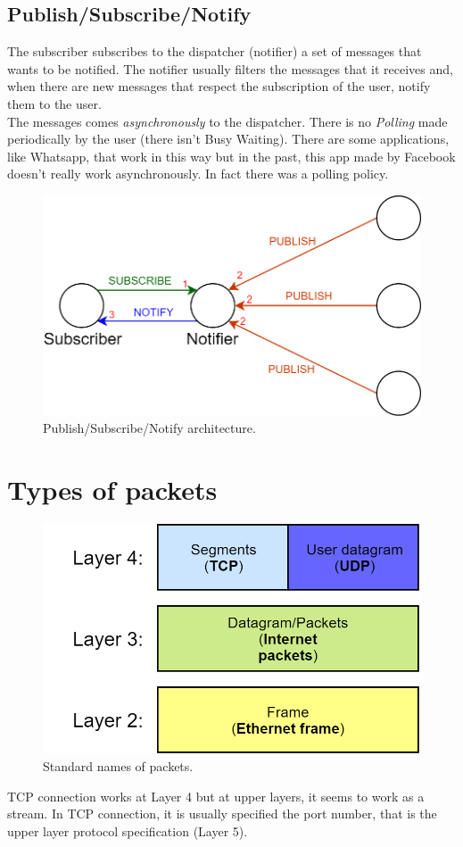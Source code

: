 \subsection{Publish/Subscribe/Notify}
The subscriber subscribes to the dispatcher (notifier) a set of messages that wants to be notified. The notifier usually filters the messages that it receives and, when there are new messages that respect the subscription of the user, notify them to the user.\\ The messages comes \textit{asynchronously} to the dispatcher. There is no \textit{Polling} made periodically by the user (there isn't Busy Waiting). There are some applications, like Whatsapp, that work in this way but in the past, this app made by Facebook doesn't really work asynchronously. In fact there was a polling policy.
\begin{figure}[H]
\centering
\includegraphics[scale=0.35]{Images/OSI/publish_subscribe}
\caption{\footnotesize{Publish/Subscribe/Notify architecture.}}\label{publish_subscribe}
\end{figure}

\section{Types of packets}
\begin{figure}[H]
\centering
\includegraphics[scale=0.28]{Images/OSI/packets}
\caption{\footnotesize{Standard names of packets.}}\label{packets}
\end{figure}
TCP connection works at Layer 4 but at upper layers, it seems to work as a stream. In TCP connection, it is usually specified the port number, that is the upper layer protocol specification (Layer 5).
